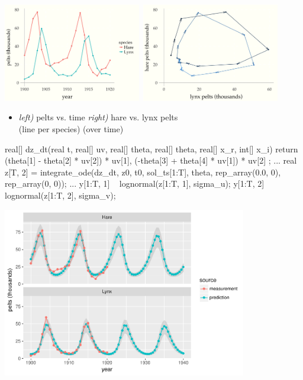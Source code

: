 \documentclass[10pt]{report}
\begin{document}
\begin{center}
\includegraphics[width=0.45\textwidth]{img/lynx-hares-1.png}~\includegraphics[width=0.45\textwidth]{img/lynx-hares-2.png}
\end{center}
\begin{itemize}
\item {\it left)} pelts vs. time \hfill
{\it right)} hare vs. lynx pelts
\\
(line per species) \hfill (over time)
\end{itemize}

\begin{stancode}
real[] dz_dt(real t, real[] uv, real[] theta,
             real[] theta, real[] x_r, int[] x_i) {
  return { (theta[1] - theta[2] * uv[2]) * uv[1],
           (-theta[3] + theta[4] * uv[1]) * uv[2] };
}
...
real z[T, 2]
  = integrate_ode(dz_dt, z0, t0, sol_ts[1:T], theta,
                  rep_array(0.0, 0), rep_array(0, 0));
...
y[1:T, 1] ~ lognormal(z[1:T, 1], sigma_u);
y[1:T, 2] ~ lognormal(z[1:T, 2], sigma_v);
\end{stancode}

\begin{center}
\includegraphics[width=0.8\textwidth]{img/lotka-volterra-posterior.pdf}
\end{center}
\end{document}

